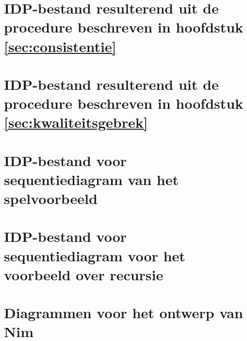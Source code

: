 \chapter{IDP-bestand resulterend uit de procedure beschreven in hoofdstuk \ref{sec:consistentie}}\label{app:consistentie}

\label{code:consistentie}

\chapter{IDP-bestand resulterend uit de procedure beschreven in hoofdstuk \ref{sec:kwaliteitsgebrek}}\label{app:kwaliteitsgebrek}

\label{code:kwaliteitsgebrek}

\chapter{IDP-bestand voor sequentiediagram van het spelvoorbeeld}\label{app:seq-diagram-game}

\label{code:seq-diagram-game}

\chapter{IDP-bestand voor sequentiediagram voor het voorbeeld over recursie}\label{app:seq-recursion}

\label{code:seq-recursion}

\chapter{Diagrammen voor het ontwerp van Nim}\label{app:design-nim}

